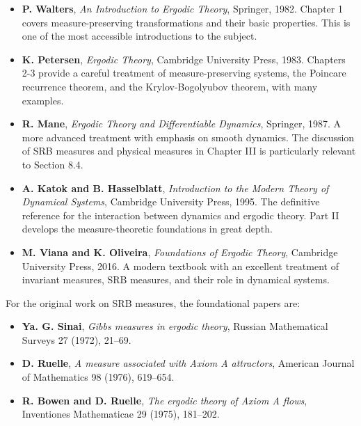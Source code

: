 \begin{itemize}[nosep]
  \item \textbf{P. Walters}, \textit{An Introduction to Ergodic Theory}, Springer, 1982. Chapter 1 covers measure-preserving transformations and their basic properties. This is one of the most accessible introductions to the subject.

  \item \textbf{K. Petersen}, \textit{Ergodic Theory}, Cambridge University Press, 1983. Chapters 2-3 provide a careful treatment of measure-preserving systems, the Poincare recurrence theorem, and the Krylov-Bogolyubov theorem, with many examples.

  \item \textbf{R. Mane}, \textit{Ergodic Theory and Differentiable Dynamics}, Springer, 1987. A more advanced treatment with emphasis on smooth dynamics. The discussion of SRB measures and physical measures in Chapter III is particularly relevant to Section 8.4.

  \item \textbf{A. Katok and B. Hasselblatt}, \textit{Introduction to the Modern Theory of Dynamical Systems}, Cambridge University Press, 1995. The definitive reference for the interaction between dynamics and ergodic theory. Part II develops the measure-theoretic foundations in great depth.

  \item \textbf{M. Viana and K. Oliveira}, \textit{Foundations of Ergodic Theory}, Cambridge University Press, 2016. A modern textbook with an excellent treatment of invariant measures, SRB measures, and their role in dynamical systems.
\end{itemize}

For the original work on SRB measures, the foundational papers are:

\begin{itemize}[nosep]
  \item \textbf{Ya. G. Sinai}, \textit{Gibbs measures in ergodic theory}, Russian Mathematical Surveys 27 (1972), 21--69.
  \item \textbf{D. Ruelle}, \textit{A measure associated with Axiom A attractors}, American Journal of Mathematics 98 (1976), 619--654.
  \item \textbf{R. Bowen and D. Ruelle}, \textit{The ergodic theory of Axiom A flows}, Inventiones Mathematicae 29 (1975), 181--202.
\end{itemize}
